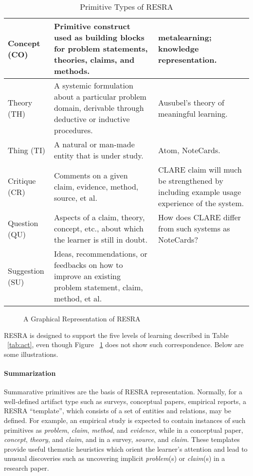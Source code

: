 {\begin{table}[hbt]
\begin{center}
\begin{tabular} {|l|p{2.25in}|p{2.25in}|}
      Concept (CO) & Primitive construct used as building blocks for
problem statements, theories, claims, and methods. & metalearning;
knowledge representation.  \\ \hline
      
      Theory (TH) & A systemic formulation about a particular problem
domain, derivable through deductive or inductive procedures. & Ausubel's
theory of meaningful learning. \\ \hline
      
      Thing (TI) & A natural or man-made entity that is under study. &
Atom, NoteCards.  \\ \hline
      
      Critique (CR) & Comments on a given claim, evidence, method,
source, et al. & CLARE claim will much be strengthened by including
example usage experience of the system. \\ \hline
      
      Question (QU) & Aspects of a claim, theory, concept, etc., about
which the learner is still in doubt. & How does CLARE differ from such
systems as NoteCards? \\ \hline
      
      Suggestion (SU) & Ideas, recommendations, or feedbacks on how to
improve an existing problem statement, claim, method, et al.  & \\ \hline
    \end{tabular}
    \caption{Primitive Types of RESRA}
    \label{tab:er}
  \end{center}
\end{table}
}

\begin{figure}[htb]
  \caption{A Graphical Representation of RESRA}
  \label{fig:resra}
\end{figure}


RESRA is designed to support the five levels of learning described in Table
~\ref{tab:act}, even though Figure ~\ref{fig:resra} does not show such
correspondence. Below are some illustrations.

\paragraph{Summarization}

Summarative primitives are the basis of RESRA representation. Normally, for
a well-defined artifact type such as surveys, conceptual papers, empirical
reports, a RESRA ``template'', which consists of a set of entities and
relations, may be defined. For example, an empirical study is expected to
contain instances of such primitives as {\it problem\/}, {\it claim\/},
{\it method\/}, and {\it evidence\/}, while in a conceptual paper, {\it
concept\/}, {\it theory\/}, and {\it claim\/}, and in a survey, {\it
source\/}, and {\it claim\/}. These templates provide useful thematic
heuristics which orient the learner's attention and lead to unusual
discoveries such as uncovering implicit {\it problem\/}(s) or {\it
claim\/}(s) in a research paper.

